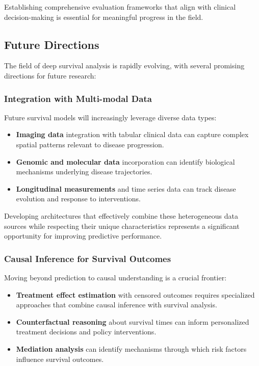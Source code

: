 Establishing comprehensive evaluation frameworks that align with clinical decision-making is essential for meaningful progress in the field.

\subsection{Future Directions}

The field of deep survival analysis is rapidly evolving, with several promising directions for future research:

\subsubsection{Integration with Multi-modal Data}

Future survival models will increasingly leverage diverse data types:

\begin{itemize}
    \item \textbf{Imaging data} integration with tabular clinical data can capture complex spatial patterns relevant to disease progression.
    
    \item \textbf{Genomic and molecular data} incorporation can identify biological mechanisms underlying disease trajectories.
    
    \item \textbf{Longitudinal measurements} and time series data can track disease evolution and response to interventions.
\end{itemize}

Developing architectures that effectively combine these heterogeneous data sources while respecting their unique characteristics represents a significant opportunity for improving predictive performance.

\subsubsection{Causal Inference for Survival Outcomes}

Moving beyond prediction to causal understanding is a crucial frontier:

\begin{itemize}
    \item \textbf{Treatment effect estimation} with censored outcomes requires specialized approaches that combine causal inference with survival analysis.
    
    \item \textbf{Counterfactual reasoning} about survival times can inform personalized treatment decisions and policy interventions.
    
    \item \textbf{Mediation analysis} can identify mechanisms through which risk factors influence survival outcomes.
\end{itemize}

